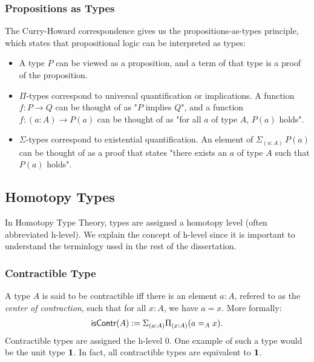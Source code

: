 \subsubsection{Propositions as Types}
The Curry-Howard correspondence gives us the propositions-as-types
principle, which states that propositional logic can be interpreted
as types:
\begin{itemize}
    \item A type $P$ can be viewed as a proposition, and a term of that
    type is a proof of the proposition.
    \item $\Pi$-types correspond to universal quantification or implications.
    A function $f : P \to Q$ can be thought of as "$P$ implies $Q$", and
    a function $f : (a : A) \to P(a)$ can be thought of as "for all $a$
    of type $A$, $P(a)$ holds".
    \item $\Sigma$-types correspond to existential quantification.
    An element of $\Sigma_(a : A)\,P(a)$ can be thought of as a proof
    that states "there exists an $a$ of type $A$ such that $P(a)$ holds".
\end{itemize}

\subsection{Homotopy Types}
In Homotopy Type Theory, types are assigned a homotopy level
(often abbreviated h-level). We explain the concept of h-level
since it is important to understand the terminlogy used in the rest
of the dissertation.
\subsubsection{Contractible Type}
A type $A$ is said to be contractible iff there is an element
$a : A$, refered to as the \emph{center of contraction}, such that
for all $x: A$, we have $a = x$. More formally:
\begin{align*}
    \operatorname{\mathsf{isContr}}(A) := \Sigma_{(a : A)}\Pi_{(x : A)}(a =_A x).
\end{align*}
Contractible types are assigned the h-level 0.
One example of such a type would be the unit type ${\mathbf{1}}$.
In fact, all contractible types are equivalent to ${\mathbf{1}}$.
